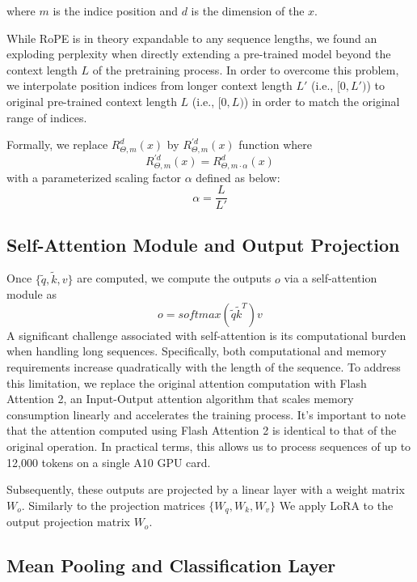 where $m$ is the indice position and $d$ is the dimension of the $x$.

While RoPE is in theory expandable to any sequence lengths, we found an exploding perplexity when directly extending a pre-trained model beyond the context length \(L\) of the pretraining process\cite{chen2023extendingPI}. In order to overcome this problem, we interpolate position indices from longer context length \(L'\) (i.e., \([0, L')\)) to original pre-trained context length \(L\) (i.e., \([0, L)\)) in order to match the original range of indices.

Formally, we replace $R^d_{\Theta, m}(x)$  by ${R^{'d}_{\Theta, m}}(x)$ function where 
\begin{equation}
     {R^{'d}_{\Theta, m}}(x)=R^d_{\Theta, m \cdot \alpha}(x)
\end{equation}
with a parameterized scaling factor $\alpha$ defined as below: \[\alpha=\dfrac{L}{L'}\]

\subsection{Self-Attention Module and Output Projection}

Once $\{\tilde{q},\tilde{k},v\}$ are computed, we compute the outputs $o$ via a self-attention module as
\begin{equation}
    o=softmax(\tilde{q}\tilde{k}^T)v
\end{equation}
A significant challenge associated with self-attention is its computational burden when handling long sequences. Specifically, both computational and memory requirements increase quadratically with the length of the sequence. To address this limitation, we replace the original attention computation with Flash Attention 2\cite{dao2023flashattention2}, an Input-Output attention algorithm that scales memory consumption linearly and accelerates the training process. It's important to note that the attention computed using Flash Attention 2 is identical to that of the original operation. In practical terms, this allows us to process sequences of up to 12,000 tokens on a single A10 GPU card.

Subsequently, these outputs are projected by a linear layer with a weight matrix $W_o$. Similarly to the projection matrices $\{W_q , W_k , W_v\}$ We apply LoRA to the output projection matrix $W_o$.

\subsection{Mean Pooling and Classification Layer}

